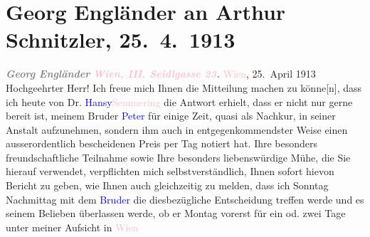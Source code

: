 

               \section[Georg Engländer an Arthur Schnitzler, 25. 4. 1913]{ Georg Engländer an Arthur Schnitzler, 25. 4. 1913}\nopagebreak{}\rehead{ }\normalsize\beginnumbering{} \toendnotes[C]{\smallbreak\pagebreak[2]} 
\toendnotes[C]{\smallbreak}\pstart
           \noindent{}{\pb}\textcolor{gray}{\textbf{\textit{Georg Engländer}}}\pend
           \pstart
           \textcolor{gray}{\textbf{\textit{\textcolor{pink}{Wien, III. Seidlgasse
                            23}{}\ledrightnote{\textcolor{pink}{Seidlgasse}}.}}}\pend
           \pstart
           \raggedleft{}\textcolor{pink}{Wien}{}\ledrightnote{\textcolor{pink}{Wien}},
                            25. April 1913\pend
           \pstart{}Hochgeehrter Herr!\pend\pstart
           Ich freue mich Ihnen die Mitteilung machen zu könne{[}n{]}, dass
                    ich heute von Dr. \textcolor{blue}{Hansy}{}\ledrightnote{\textcolor{blue}{Franz Hansy}}{ }\textcolor{pink}{Semmering}{}\ledrightnote{\textcolor{pink}{Semmering}} die Antwort
                    erhielt, dass er nicht nur gerne bereit ist, meinem Bruder \textcolor{blue}{Peter}{}\ledrightnote{\textcolor{blue}{Peter Altenberg}} für einige Zeit, quasi als Nachkur, in seiner Anstalt
                    aufzunehmen, sondern ihm auch in entgegenkommendster Weise einen
                    ausserordentlich bescheidenen Preis per Tag notiert hat.\pend
           \pstart
           Ihre besonders freundschaftliche Teilnahme sowie Ihre besonders liebenswürdige
                    Mühe, die Sie hierauf verwendet, verpflichten mich selbstverständlich, Ihnen
                    sofort hievon Bericht zu geben, wie Ihnen auch gleichzeitig zu melden, dass ich
                        Sonntag{ }{\pb}Nachmittag mit dem \textcolor{blue}{Bruder}{} die diesbezügliche Entscheidung treffen werde
                    und es seinem Belieben überlassen werde, ob er Montag vorerst für
                    ein od. zwei Tage unter meiner Aufsicht in \textcolor{pink}{Wien}{}\ledrightnote{\textcolor{pink}{Wien}}
